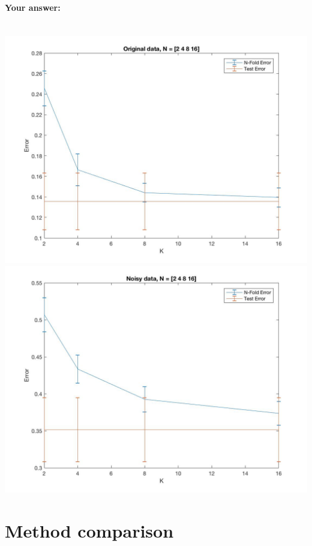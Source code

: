 \documentclass[english]{article}
\begin{document}
\begin{itemize}
\paragraph{Your answer:}
 ~\\
 
 {\tt  \includegraphics[width=1\textwidth]{original_Nfolds.jpg}}
 \\    
 
 {\tt \includegraphics[width=1\textwidth]{noisy_Nfolds.jpg}}
 \\
  

\end{itemize}

\section{Method comparison }
\end{document}
